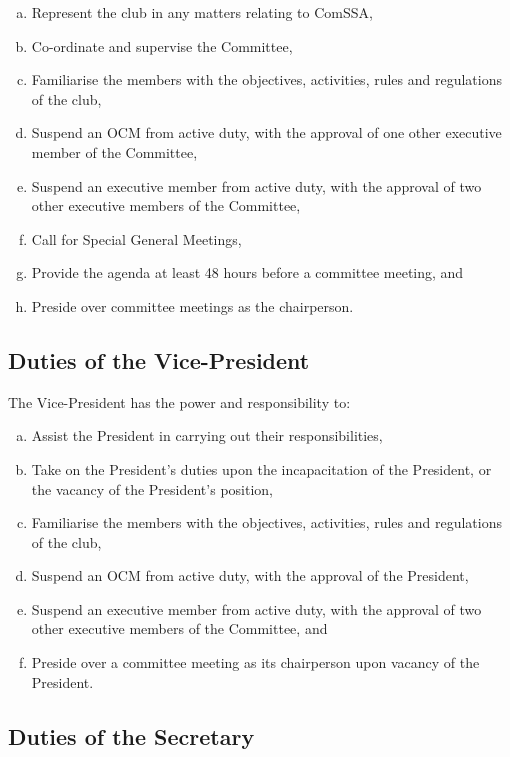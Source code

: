 \documentclass[a4paper,12pt]{article}
\begin{document}
\begin{enumerate}[a)]
	\item Represent the club in any matters relating to ComSSA,
	\item Co-ordinate and supervise the Committee,
	\item Familiarise the members with the objectives, activities, rules and regulations of the club,
	\item Suspend an OCM from active duty, with the approval of one other executive member of the Committee,
	\item Suspend an executive member from active duty, with the approval of two other executive members of the Committee,
	\item Call for Special General Meetings,
	\item Provide the agenda at least 48 hours before a committee meeting, and
	\item Preside over committee meetings as the chairperson.
\end{enumerate}

\subsection{Duties of the Vice-President}

The Vice-President has the power and responsibility to:

\begin{enumerate}[a)]
	\item Assist the President in carrying out their responsibilities,
	\item Take on the President's duties upon the incapacitation of the President, or the vacancy of the President's position,
	\item Familiarise the members with the objectives, activities, rules and regulations of the club,
	\item Suspend an OCM from active duty, with the approval of the President,
	\item Suspend an executive member from active duty, with the approval of two other executive members of the Committee, and
	\item Preside over a committee meeting as its chairperson upon vacancy of the President.
\end{enumerate}

\subsection{Duties of the Secretary}
\end{document}

